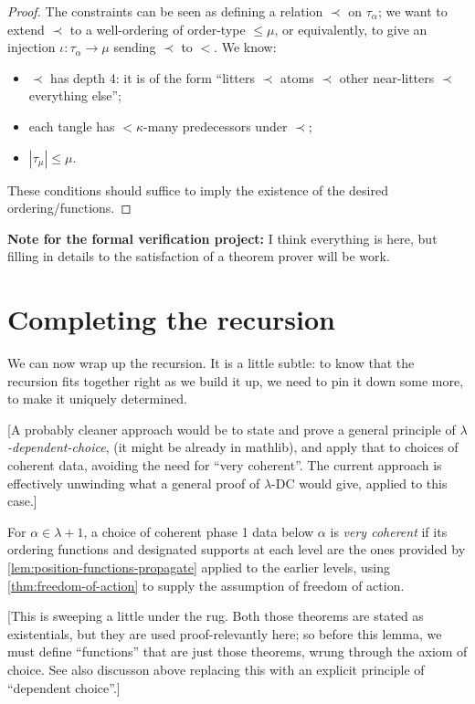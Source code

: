 \begin{proof}
  The constraints can be seen as defining a relation $\prec$ on $\tau_\alpha$; we want to extend $\prec$ to a well-ordering of order-type $\leq \mu$, or equivalently, to give an injection $\iota:\tau_\alpha \to \mu$ sending $\prec$ to $<$.  We know:
  \begin{itemize}
  \item $\prec$ has depth 4: it is of the form “litters $\prec$ atoms $\prec$ other near-litters $\prec$ everything else”;
  \item each tangle has $<\kappa$-many predecessors under $\prec$;
  \item $|\tau_\mu| \leq \mu$.
  \end{itemize}
  These conditions should suffice to imply the existence of the desired ordering/functions.
\end{proof}

{\bf Note for the formal verification project:}  I think everything is here, but filling in details to the satisfaction of a theorem prover will be work.

\section{Completing the recursion}

We can now wrap up the recursion.  It is a little subtle: to know that the recursion fits together right as we build it up, we need to pin it down some more, to make it uniquely determined.

[A probably cleaner approach would be to state and prove a general principle of \emph{$\lambda$-dependent-choice}, (it might be already in mathlib), and apply that to choices of coherent data, avoiding the need for “very coherent”.  The current approach is effectively unwinding what a general proof of $\lambda$-DC would give, applied to this case.]

\begin{definition}
  \label{def:very-coherent-data}
  For $\alpha \in \lambda + 1$, a choice of coherent phase 1 data below $\alpha$ is \emph{very coherent} if its ordering functions and designated supports at each level are the ones provided by \cref{lem:position-functions-propagate} applied to the earlier levels, using \cref{thm:freedom-of-action} to supply the assumption of freedom of action.

  [This is sweeping a little under the rug. Both those theorems are stated as existentials, but they are used proof-relevantly here; so before this lemma, we must define “functions” that are just those theorems, wrung through the axiom of choice.  See also discusson above replacing this with an explicit principle of “dependent choice”.]
\end{definition}

